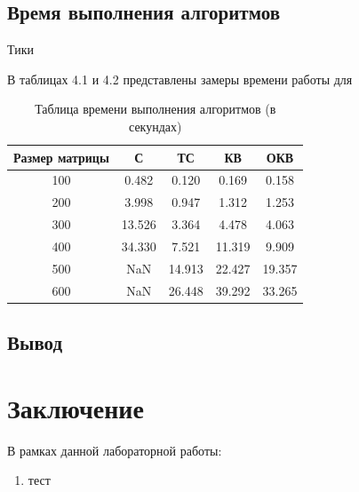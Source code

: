 \documentclass[12pt]{report}
\begin{document}
\section{Время выполнения алгоритмов}
Тики
\newline

В таблицах 4.1 и 4.2 представлены замеры времени работы для

\begin{table} [h!]
	\caption{Таблица времени выполнения алгоритмов (в секундах)}
	\begin{center}
		\begin{tabular}{|c c c c c|} 
		 	\hline
			Размер матрицы & С & ТС & КВ & ОКВ \\  
		 	\hline
		 	100 & 0.482 & 0.120 & 0.169 & 0.158 \\
		 	\hline
		 	200 & 3.998 & 0.947 & 1.312 & 1.253 \\
		 	\hline
			300 & 13.526 & 3.364 & 4.478 & 4.063 \\
			\hline
			400 & 34.330 & 7.521 & 11.319 & 9.909 \\
			\hline
			500 & NaN & 14.913 & 22.427 & 19.357 \\
			\hline
			600 & NaN & 26.448 & 39.292 & 33.265 \\
			\hline
		\end{tabular}
	\end{center}
\end{table}


\section{Вывод}

\chapter*{Заключение}

В рамках данной лабораторной работы:

\begin{enumerate}
	\item тест
\end{enumerate}




\end{document}

